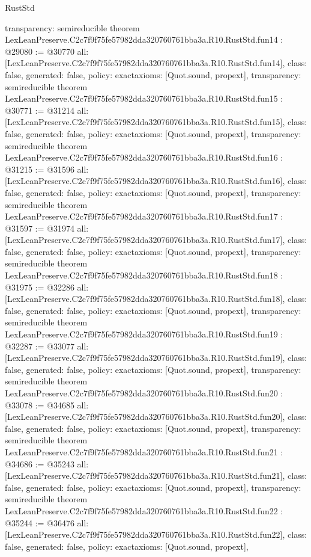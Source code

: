 \begin{lexlean}{RustStd}
\begin{coremodule}
{  transparency: semireducible
}
theorem LexLeanPreserve.C2c7f9f75fe57982dda320760761bba3a.R10.RustStd.fun14 : @29080 := @30770 {
  all: [LexLeanPreserve.C2c7f9f75fe57982dda320760761bba3a.R10.RustStd.fun14],
  class: false,
  generated: false,
  policy: exact{axioms: [Quot.sound, propext]},
  transparency: semireducible
}
theorem LexLeanPreserve.C2c7f9f75fe57982dda320760761bba3a.R10.RustStd.fun15 : @30771 := @31214 {
  all: [LexLeanPreserve.C2c7f9f75fe57982dda320760761bba3a.R10.RustStd.fun15],
  class: false,
  generated: false,
  policy: exact{axioms: [Quot.sound, propext]},
  transparency: semireducible
}
theorem LexLeanPreserve.C2c7f9f75fe57982dda320760761bba3a.R10.RustStd.fun16 : @31215 := @31596 {
  all: [LexLeanPreserve.C2c7f9f75fe57982dda320760761bba3a.R10.RustStd.fun16],
  class: false,
  generated: false,
  policy: exact{axioms: [Quot.sound, propext]},
  transparency: semireducible
}
theorem LexLeanPreserve.C2c7f9f75fe57982dda320760761bba3a.R10.RustStd.fun17 : @31597 := @31974 {
  all: [LexLeanPreserve.C2c7f9f75fe57982dda320760761bba3a.R10.RustStd.fun17],
  class: false,
  generated: false,
  policy: exact{axioms: [Quot.sound, propext]},
  transparency: semireducible
}
theorem LexLeanPreserve.C2c7f9f75fe57982dda320760761bba3a.R10.RustStd.fun18 : @31975 := @32286 {
  all: [LexLeanPreserve.C2c7f9f75fe57982dda320760761bba3a.R10.RustStd.fun18],
  class: false,
  generated: false,
  policy: exact{axioms: [Quot.sound, propext]},
  transparency: semireducible
}
theorem LexLeanPreserve.C2c7f9f75fe57982dda320760761bba3a.R10.RustStd.fun19 : @32287 := @33077 {
  all: [LexLeanPreserve.C2c7f9f75fe57982dda320760761bba3a.R10.RustStd.fun19],
  class: false,
  generated: false,
  policy: exact{axioms: [Quot.sound, propext]},
  transparency: semireducible
}
theorem LexLeanPreserve.C2c7f9f75fe57982dda320760761bba3a.R10.RustStd.fun20 : @33078 := @34685 {
  all: [LexLeanPreserve.C2c7f9f75fe57982dda320760761bba3a.R10.RustStd.fun20],
  class: false,
  generated: false,
  policy: exact{axioms: [Quot.sound, propext]},
  transparency: semireducible
}
theorem LexLeanPreserve.C2c7f9f75fe57982dda320760761bba3a.R10.RustStd.fun21 : @34686 := @35243 {
  all: [LexLeanPreserve.C2c7f9f75fe57982dda320760761bba3a.R10.RustStd.fun21],
  class: false,
  generated: false,
  policy: exact{axioms: [Quot.sound, propext]},
  transparency: semireducible
}
theorem LexLeanPreserve.C2c7f9f75fe57982dda320760761bba3a.R10.RustStd.fun22 : @35244 := @36476 {
  all: [LexLeanPreserve.C2c7f9f75fe57982dda320760761bba3a.R10.RustStd.fun22],
  class: false,
  generated: false,
  policy: exact{axioms: [Quot.sound, propext]},
}
\end{coremodule}
\end{lexlean}
